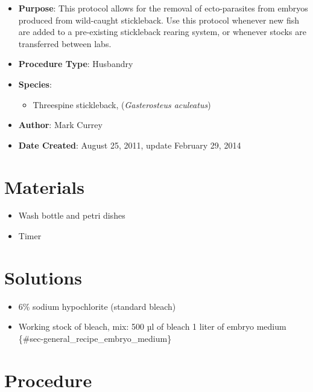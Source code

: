 \documentclass[
  letterpaper,
  DIV=11,
  numbers=noendperiod]{scrreprt}
\providecommand{\tightlist}{%
  \setlength{\itemsep}{0pt}\setlength{\parskip}{0pt}}\usepackage{longtable,booktabs,array}
\begin{document}
\begin{itemize}
\tightlist
\item
  \textbf{Purpose}: This protocol allows for the removal of
  ecto-parasites from embryos produced from wild-caught stickleback. Use
  this protocol whenever new fish are added to a pre-existing
  stickleback rearing system, or whenever stocks are transferred between
  labs.
\item
  \textbf{Procedure Type}: Husbandry
\item
  \textbf{Species}:

  \begin{itemize}
  \tightlist
  \item
    Threespine stickleback, (\emph{Gasterosteus aculeatus})
  \end{itemize}
\item
  \textbf{Author}: Mark Currey\\
\item
  \textbf{Date Created}: August 25, 2011, update February 29, 2014
\end{itemize}

\hypertarget{materials-29}{%
\section{Materials}\label{materials-29}}

\begin{itemize}
\tightlist
\item
  Wash bottle and petri dishes
\item
  Timer
\end{itemize}

\hypertarget{solutions-25}{%
\section{Solutions}\label{solutions-25}}

\begin{itemize}
\tightlist
\item
  6\% sodium hypochlorite (standard bleach)
\item
  Working stock of bleach, mix: 500 µl of bleach 1 liter of embryo
  medium \{\#sec-general\_recipe\_embryo\_medium\}
\end{itemize}

\hypertarget{procedure-30}{%
\section{Procedure}\label{procedure-30}}
\end{document}
